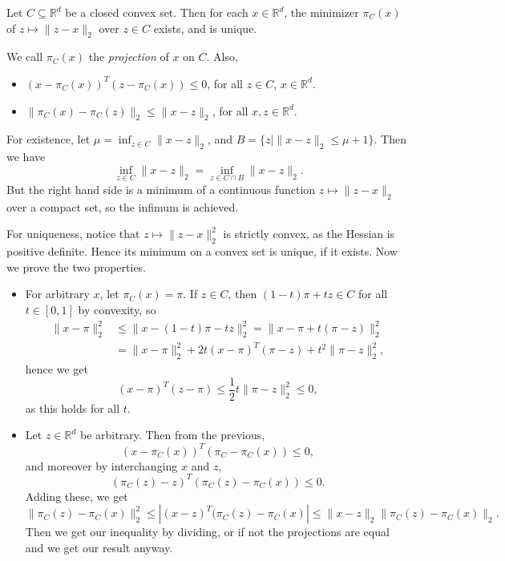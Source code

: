 \documentclass[12pt]{article}
\begin{document}
\begin{proposition}
	Let $C \subseteq \mathbb{R}^d$ be a closed convex set. Then for each $x \in \mathbb{R}^d$, the minimizer $\pi_C(x)$ of $z \mapsto \|z - x\|_2$ over $z \in C$ exists, and is unique.

	We call $\pi_C(x)$ the \emph{projection} of $x$ on $C$. Also,
	\begin{itemize}
		\item $(x - \pi_C(x))^T (z - \pi_C(x)) \leq 0$, for all $z \in C$, $x \in \mathbb{R}^d$.
		\item $\|\pi_C(x) - \pi_C(z)\|_2 \leq \|x - z\|_2$, for all $x, z \in \mathbb{R}^d$.
	\end{itemize}
\end{proposition}

\begin{proofbox}
	For existence, let $\mu = \inf_{z \in C}\|x - z\|_2$, and $B = \{z \mid \|x - z\|_2 \leq \mu + 1\}$. Then we have
	\[
	\inf_{z \in C} \|x - z\|_2 = \inf_{z \in C \cap B} \|x - z\|_2.
	\]
	But the right hand side is a minimum of a continuous function $z \mapsto \|z - x\|_2$ over a compact set, so the infimum is achieved.

	For uniqueness, notice that $z \mapsto \|z - x\|_2^2$ is strictly convex, as the Hessian is positive definite. Hence its minimum on a convex set is unique, if it exists. Now we prove the two properties.

	\begin{itemize}
		\item For arbitrary $x$, let $\pi_C(x) = \pi$. If $z \in C$, then $(1 - t)\pi + t z \in C$ for all $t \in [0, 1]$ by convexity, so
			\begin{align*}
				\|x - \pi\|_2^2 & \leq \|x - (1 - t)\pi - tz\|_2^2 = \|x - \pi + t(\pi - z)\|_2^2 \\
						&= \|x - \pi\|_2^2 + 2t(x - \pi)^T(\pi - z) + t^2 \|\pi - z\|_2^2,
			\end{align*}
			hence we get
			\[
				(x - \pi)^T(z - \pi) \leq \frac{1}{2} t \|\pi - z\|_2^2 \leq 0,
			\]
			as this holds for all $t$.
		\item Let $z \in \mathbb{R}^d$ be arbitrary. Then from the previous,
			\[
				(x - \pi_C(x))^T(\pi_C - \pi_C(x)) \leq 0,
			\]
			and moreover by interchanging $x$ and $z$,
			\[
				(\pi_C(z) - z)^T(\pi_C(z) - \pi_C(x)) \leq 0.
			\]
			Adding these, we get
			\[
			\|\pi_C(z) - \pi_C(x)\|_2^2 \leq |(x - z)^T(\pi_C(z) - \pi_C(x)| \leq \|x-z\|_2 \|\pi_C(z) - \pi_C(x)\|_2.
			\]
			Then we get our inequality by dividing, or if not the projections are equal and we get our result anyway.
	\end{itemize}
\end{proofbox}
\end{document}
